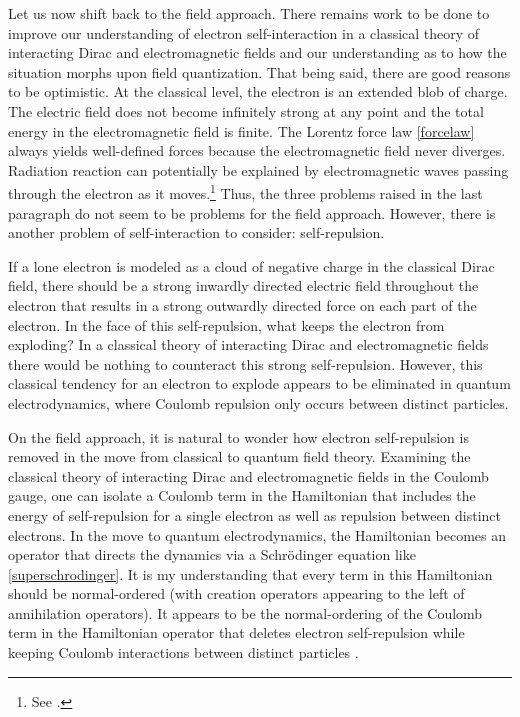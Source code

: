 \documentclass[onecolumn,secnumarabic,amsmath,amssymb,balancelastpage,nofootinbib,12pt]{article}
\begin{document}
Let us now shift back to the field approach.  There remains work to be done to improve our understanding of electron self-interaction in a classical theory of interacting Dirac and electromagnetic fields and our understanding as to how the situation morphs upon field quantization.  That being said, there are good reasons to be optimistic.  At the classical level, the electron is an extended blob of charge.  The electric field does not become infinitely strong at any point and the total energy in the electromagnetic field is finite.  The Lorentz force law \eqref{forcelaw} always yields well-defined forces because the electromagnetic field never diverges.  Radiation reaction can potentially be explained by electromagnetic waves passing through the electron as it moves.\footnote{See \citet[sec.\ 2.2]{gravitationalfield}.}  Thus, the three problems raised in the last paragraph do not seem to be problems for the field approach.  However, there is another problem of self-interaction to consider: self-repulsion.

If a lone electron is modeled as a cloud of negative charge in the classical Dirac field, there should be a strong inwardly directed electric field throughout the electron that results in a strong outwardly directed force on each part of the electron.  In the face of this self-repulsion, what keeps the electron from exploding?  In a classical theory of interacting Dirac and electromagnetic fields there would be nothing to counteract this strong self-repulsion.  However, this classical tendency for an electron to explode appears to be eliminated in quantum electrodynamics, where Coulomb repulsion only occurs between distinct particles.

On the field approach, it is natural to wonder how electron self-repulsion is removed in the move from classical to quantum field theory.  Examining the classical theory of interacting Dirac and electromagnetic fields in the Coulomb gauge, one can isolate a Coulomb term in the Hamiltonian that includes the energy of self-repulsion for a single electron as well as repulsion between distinct electrons.  In the move to quantum electrodynamics, the Hamiltonian becomes an operator that directs the dynamics via a Schr\"{o}dinger equation like \eqref{superschrodinger}.  It is my understanding that every term in this Hamiltonian should be normal-ordered (with creation operators appearing to the left of annihilation operators).  It appears to be the normal-ordering of the Coulomb term in the Hamiltonian operator that deletes electron self-repulsion while keeping Coulomb interactions between distinct particles \citep{selfrepulsion}.
\end{document}
